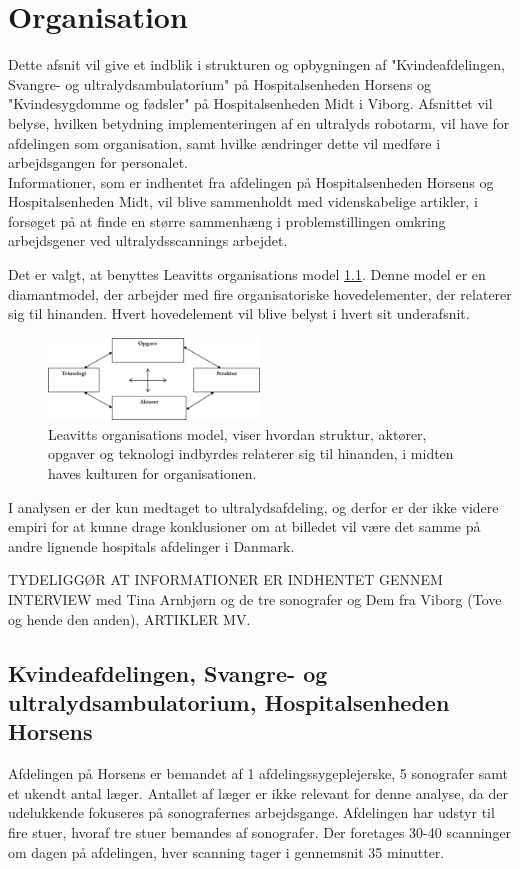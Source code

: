 \chapter{Organisation}
Dette afsnit vil give et indblik i strukturen og opbygningen af "Kvindeafdelingen, Svangre- og ultralydsambulatorium" på Hospitalsenheden Horsens og "Kvindesygdomme og fødsler" på Hospitalsenheden Midt i Viborg. Afsnittet vil belyse, hvilken betydning implementeringen af en ultralyds robotarm, vil have for afdelingen som organisation, samt hvilke ændringer dette vil medføre i arbejdsgangen for personalet. \\
Informationer, som er indhentet fra afdelingen på Hospitalsenheden Horsens og Hospitalsenheden Midt, vil blive sammenholdt med videnskabelige artikler, i forsøget på at finde en større sammenhæng i problemstillingen omkring arbejdsgener ved ultralydsscannings arbejdet.

Det er valgt, at benyttes Leavitts organisations model \ref{LeavittModel}. Denne model er en diamantmodel, der arbejder med fire organisatoriske hovedelementer, der relaterer sig til hinanden. Hvert hovedelement vil blive belyst i hvert sit underafsnit. 

\begin{figure}[h!]\centering
	\includegraphics[width = 0.5\textwidth]{Figurer/LeavittModel}
	\caption{Leavitts organisations model, viser hvordan struktur, aktører, opgaver og teknologi indbyrdes relaterer sig til hinanden, i midten haves kulturen for organisationen.}
	\label{LeavittModel}
\end{figure}
I analysen er der kun medtaget to ultralydsafdeling, og derfor er der ikke videre empiri for at kunne drage konklusioner om at billedet vil være det samme på andre lignende hospitals afdelinger i Danmark. 

TYDELIGGØR AT INFORMATIONER ER INDHENTET GENNEM INTERVIEW med Tina Arnbjørn og de tre sonografer og Dem fra Viborg (Tove og hende den anden), ARTIKLER MV.

\section{Kvindeafdelingen, Svangre- og ultralydsambulatorium, Hospitalsenheden Horsens}
Afdelingen på Horsens er bemandet af 1 afdelingssygeplejerske, 5 sonografer samt et ukendt antal læger. Antallet af læger er ikke relevant for denne analyse, da der udelukkende fokuseres på sonografernes arbejdsgange. Afdelingen har udstyr til fire stuer, hvoraf tre stuer bemandes af sonografer. Der foretages 30-40 scanninger om dagen på afdelingen, hver scanning tager i gennemsnit 35 minutter.

